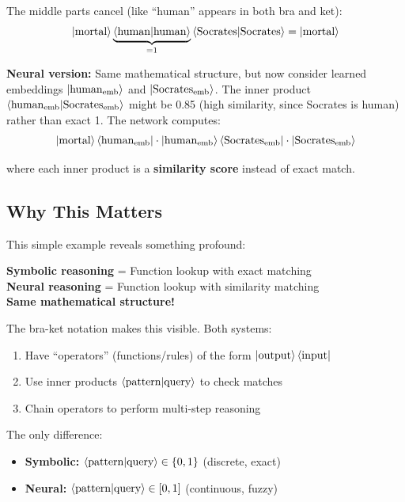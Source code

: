 \documentclass[11pt,a4paper]{article}
\theoremstyle{definition}
\begin{document}
The middle parts cancel (like ``human'' appears in both bra and ket):
\begin{equation}
\ket{\text{mortal}} \underbrace{\braket{\text{human}|\text{human}}}_{=1} \braket{\text{Socrates}|\text{Socrates}} = \ket{\text{mortal}}
\end{equation}

\textbf{Neural version:}
Same mathematical structure, but now consider learned embeddings $\ket{\text{human}_{\text{emb}}}$ and $\ket{\text{Socrates}_{\text{emb}}}$. The inner product $\braket{\text{human}_{\text{emb}}|\text{Socrates}_{\text{emb}}}$ might be 0.85 (high similarity, since Socrates is human) rather than exact 1. The network computes:
\begin{equation}
\ket{\text{mortal}}\bra{\text{human}_{\text{emb}}} \cdot \ket{\text{human}_{\text{emb}}}\bra{\text{Socrates}_{\text{emb}}} \cdot \ket{\text{Socrates}_{\text{emb}}}
\end{equation}

where each inner product is a \textbf{similarity score} instead of exact match.

\subsection{Why This Matters}

This simple example reveals something profound:

\begin{center}
\textbf{Symbolic reasoning} = Function lookup with exact matching\\
\textbf{Neural reasoning} = Function lookup with similarity matching\\
\textbf{Same mathematical structure!}
\end{center}

The bra-ket notation makes this visible. Both systems:
\begin{enumerate}
\item Have ``operators'' (functions/rules) of the form $\ket{\text{output}}\bra{\text{input}}$
\item Use inner products $\braket{\text{pattern}|\text{query}}$ to check matches
\item Chain operators to perform multi-step reasoning
\end{enumerate}

The only difference:
\begin{itemize}
\item \textbf{Symbolic:} $\braket{\text{pattern}|\text{query}} \in \{0, 1\}$ (discrete, exact)
\item \textbf{Neural:} $\braket{\text{pattern}|\text{query}} \in [0, 1]$ (continuous, fuzzy)
\end{itemize}
\end{document}
